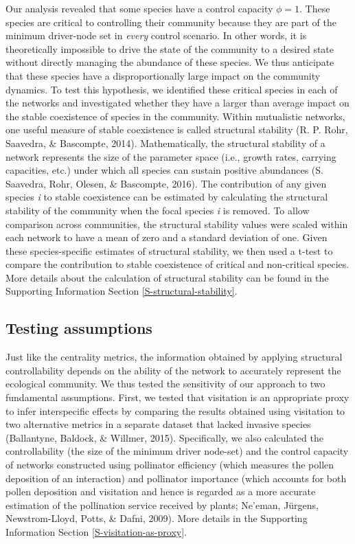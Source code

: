 \documentclass[a4paper]{artikel1}
\newcommand{\R}[1]{\label{#1}\linelabel{#1}}
\theoremstyle{definition}
\theoremstyle{definition}
\theoremstyle{definition}
\theoremstyle{remark}
\begin{document}
Our analysis revealed that some species have a control capacity
\(\phi = 1\). These species are critical to controlling their community
because they are part of the minimum driver-node set in \emph{every}
control scenario. In other words, it is theoretically impossible to
drive the state of the community to a desired state without directly
managing the abundance of these species. We thus anticipate that these
species have a disproportionally large impact on the community dynamics.
To test this hypothesis, we identified these critical species in each of
the networks and investigated whether they have a larger than average
impact on the stable coexistence of species in the community. Within
mutualistic networks, one useful measure of stable coexistence is called
structural stability (R. P. Rohr, Saavedra, \& Bascompte, 2014).
Mathematically, the structural stability of a network represents the
size of the parameter space (i.e., growth rates, carrying capacities,
etc.) under which all species can sustain positive abundances (S.
Saavedra, Rohr, Olesen, \& Bascompte, 2016). The contribution of any
given species \emph{i} to stable coexistence can be estimated by
calculating the structural stability of the community when the focal
species \emph{i} is removed. To allow comparison across communities, the
structural stability values were scaled within each network to have a
mean of zero and a standard deviation of one. Given these
species-specific estimates of structural stability, we then used a
t-test to compare the contribution to stable coexistence of critical and
non-critical species. More details about the calculation of structural
stability can be found in the Supporting Information Section
\ref{S-structural-stability}.

\subsection{Testing assumptions}\label{testing-assumptions}

\R{testing-assumptions-line}Just like the centrality metrics, the
information obtained by applying structural controllability depends on
the ability of the network to accurately represent the ecological
community. We thus tested the sensitivity of our approach to two
fundamental assumptions. First, we tested that visitation is an
appropriate proxy to infer interspecific effects by comparing the
results obtained using visitation to two alternative metrics in a
separate dataset that lacked invasive species (Ballantyne, Baldock, \&
Willmer, 2015). Specifically, we also calculated the controllability
(the size of the minimum driver node-set) and the control capacity of
networks constructed using pollinator efficiency (which measures the
pollen deposition of an interaction) and pollinator importance (which
accounts for both pollen deposition and visitation and hence is regarded
as a more accurate estimation of the pollination service received by
plants; Ne'eman, Jürgens, Newstrom-Lloyd, Potts, \& Dafni, 2009). More
details in the Supporting Information Section
\ref{S-visitation-as-proxy}.
\end{document}
